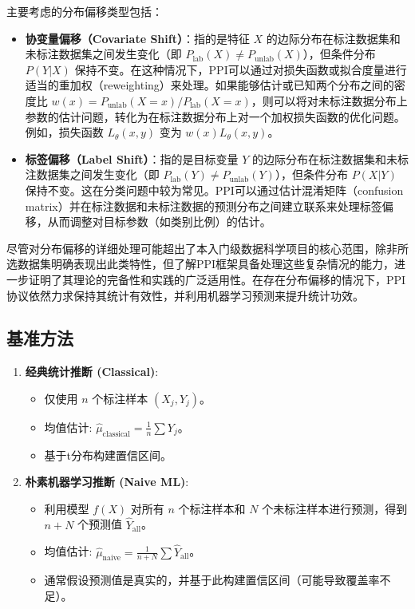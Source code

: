 \documentclass[12pt,a4paper]{article}
\begin{document}
主要考虑的分布偏移类型包括：
\begin{itemize}
    \item \textbf{协变量偏移（Covariate Shift）}：指的是特征 $X$ 的边际分布在标注数据集和未标注数据集之间发生变化（即 $P_{\text{lab}}(X) \neq P_{\text{unlab}}(X)$），但条件分布 $P(Y|X)$ 保持不变。在这种情况下，PPI可以通过对损失函数或拟合度量进行适当的重加权（reweighting）来处理。如果能够估计或已知两个分布之间的密度比 $w(x) = P_{\text{unlab}}(X=x) / P_{\text{lab}}(X=x)$，则可以将对未标注数据分布上参数的估计问题，转化为在标注数据分布上对一个加权损失函数的优化问题。例如，损失函数 $L_{\theta}(x,y)$ 变为 $w(x)L_{\theta}(x,y)$。
    \item \textbf{标签偏移（Label Shift）}：指的是目标变量 $Y$ 的边际分布在标注数据集和未标注数据集之间发生变化（即 $P_{\text{lab}}(Y) \neq P_{\text{unlab}}(Y)$），但条件分布 $P(X|Y)$ 保持不变。这在分类问题中较为常见。PPI可以通过估计混淆矩阵（confusion matrix）并在标注数据和未标注数据的预测分布之间建立联系来处理标签偏移，从而调整对目标参数（如类别比例）的估计。
\end{itemize}
尽管对分布偏移的详细处理可能超出了本入门级数据科学项目的核心范围，除非所选数据集明确表现出此类特性，但了解PPI框架具备处理这些复杂情况的能力，进一步证明了其理论的完备性和实践的广泛适用性。在存在分布偏移的情况下，PPI协议依然力求保持其统计有效性，并利用机器学习预测来提升统计功效。

\subsection{基准方法}
\begin{enumerate}
    \item \textbf{经典统计推断 (Classical)}:
    \begin{itemize}
        \item 仅使用 $n$ 个标注样本 $(X_j, Y_j)$。
        \item 均值估计: $\hat{\mu}_{\text{classical}} = \frac{1}{n} \sum Y_j$。
        \item 基于t分布构建置信区间。
    \end{itemize}
    \item \textbf{朴素机器学习推断 (Naive ML)}:
    \begin{itemize}
        \item 利用模型 $f(X)$ 对所有 $n$ 个标注样本和 $N$ 个未标注样本进行预测，得到 $n+N$ 个预测值 $\hat{Y}_{\text{all}}$。
        \item 均值估计: $\hat{\mu}_{\text{naive}} = \frac{1}{n+N} \sum \hat{Y}_{\text{all}}$。
        \item 通常假设预测值是真实的，并基于此构建置信区间（可能导致覆盖率不足）。
    \end{itemize}
\end{enumerate}
\end{document}
